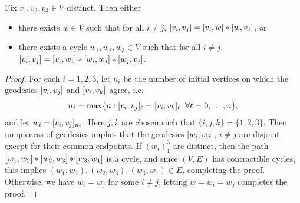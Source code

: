 \begin{lemma}
\label{lemmacontractiblecycles2}
Fix $v_1,v_2,v_3\in V$ distinct. Then either
\begin{itemize}
\item[(1)] there exists $w\in V$ such that for all $i\neq j$, $[v_i,v_j] = [v_i,w]\ast [w,v_j]$, or
\item[(2)] there exists a cycle $w_1,w_2,w_3\in V$ such that for all $i\neq j$, $[v_i,v_j] = [v_i,w_i]\ast [w_i,w_j]\ast [w_j,v_j]$.
\end{itemize}
\end{lemma}
\begin{proof}
For each $i = 1,2,3$, let $n_i$ be the number of initial vertices on which the geodesics $[v_i,v_j]$ and $[v_i,v_k]$ agree, i.e.
\[
n_i = \max\{n : [v_i,v_j]_\ell = [v_i,v_k]_\ell \;\;\forall \ell = 0,\ldots,n\},
\]
and let $w_i = [v_i,v_j]_{n_i}$. Here $j,k$ are chosen such that $\{i,j,k\} = \{1,2,3\}$. Then uniqueness of geodesics implies that the geodesics $[w_i,w_j]$, $i\neq j$ are disjoint except for their common endpoints. If $(w_i)_1^3$ are distinct, then the path $[w_1,w_2]\ast[w_2,w_3]\ast[w_3,w_1]$ is a cycle, and since $(V,E)$ has contractible cycles, this implies $(w_1,w_2),(w_2,w_3),(w_3,w_1)\in E$, completing the proof. Otherwise, we have $w_i = w_j$ for some $i\neq j$; letting $w = w_i = w_j$ completes the proof.
\end{proof}


